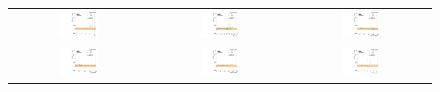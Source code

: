 \begin{figure}[htbp]
  \begin{center}
    \begin{tabular}{ccc}
      \includegraphics[width=0.30\textwidth]{bkgd/figs/rSFOFFromRMuE_ZPeakControlCentral_Run2015_25ns_NJets_None.pdf} & 
      \includegraphics[width=0.30\textwidth]{bkgd/figs/rSFOFFromRMuE_ZPeakControlCentral_Run2015_25ns_nVtx_None.pdf}  &
      \includegraphics[width=0.30\textwidth]{bkgd/figs/rSFOFFromRMuE_ZPeakControlCentral_Run2015_25ns_TrailingPt_None.pdf} \\
      \includegraphics[width=0.30\textwidth]{bkgd/figs/rSFOFFromRMuE_ZPeakControlCentral_Run2015_25ns_Mll_None.pdf} &
      \includegraphics[width=0.30\textwidth]{bkgd/figs/rSFOFFromRMuE_ZPeakControlCentral_Run2015_25ns_MET_None.pdf} &
      \includegraphics[width=0.30\textwidth]{bkgd/figs/rSFOFFromRMuE_ZPeakControlCentral_Run2015_25ns_NBJets_None.pdf} \\

\end{tabular}
\end{center}
\end{figure}
